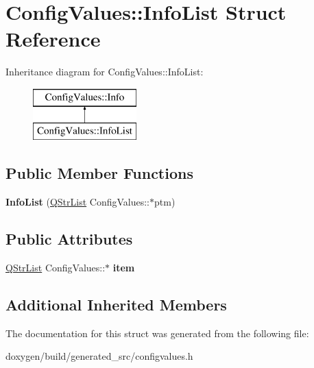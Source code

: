 \hypertarget{struct_config_values_1_1_info_list}{}\section{Config\+Values\+::Info\+List Struct Reference}
\label{struct_config_values_1_1_info_list}
Inheritance diagram for Config\+Values\+::Info\+List\+:\begin{figure}[H]
\begin{center}
\leavevmode
\includegraphics[height=2.000000cm]{struct_config_values_1_1_info_list}
\end{center}
\end{figure}
\subsection*{Public Member Functions}
\begin{DoxyCompactItemize}
\item 
\mbox{\label{struct_config_values_1_1_info_list_a67657a23e88236445f8462e07166ea54}} 
{\bfseries Info\+List} (\mbox{\hyperlink{class_q_str_list}{Q\+Str\+List}} Config\+Values\+::$\ast$ptm)
\end{DoxyCompactItemize}
\subsection*{Public Attributes}
\begin{DoxyCompactItemize}
\item 
\mbox{\label{struct_config_values_1_1_info_list_ab43f6c84bf4a3af41dc1db88d1b7f02b}} 
\mbox{\hyperlink{class_q_str_list}{Q\+Str\+List}} Config\+Values\+::$\ast$ {\bfseries item}
\end{DoxyCompactItemize}
\subsection*{Additional Inherited Members}


The documentation for this struct was generated from the following file\+:\begin{DoxyCompactItemize}
\item 
doxygen/build/generated\+\_\+src/configvalues.\+h\end{DoxyCompactItemize}
